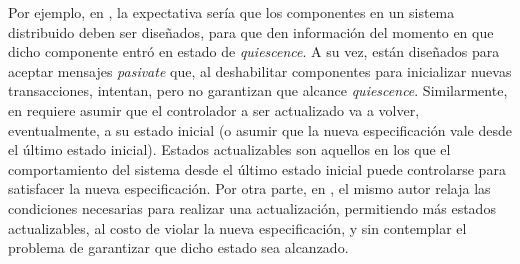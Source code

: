 Por ejemplo, en \cite{60317}, la expectativa sería que los componentes en un sistema distribuido deben ser diseñados, para que
den información del momento en que dicho componente entró en estado de \emph{quiescence}. A su vez, están diseñados para aceptar mensajes
\emph{pasivate} que, al deshabilitar componentes para inicializar nuevas transacciones, intentan, pero no garantizan
que alcance \emph{quiescence}. Similarmente, en \cite{6224401} requiere asumir que el controlador a ser actualizado va a
volver, eventualmente, a su estado inicial (o asumir que la nueva especificación vale desde el último estado inicial). Estados
actualizables son aquellos en los que el comportamiento del sistema desde el último estado inicial puede controlarse
para satisfacer la nueva especificación.  Por otra parte, en \cite{PanzicaLaManna:2013:FCC:2487336.2487349}, el mismo
autor relaja las condiciones necesarias para realizar una actualización, permitiendo más estados actualizables, al
costo de violar la nueva especificación, y sin contemplar el problema de garantizar que dicho estado sea alcanzado.

